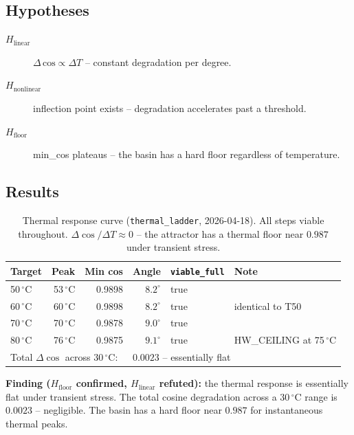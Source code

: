 \documentclass[11pt, a4paper]{article}
\begin{document}
\subsection{Hypotheses}

\begin{description}
  \item[$H_\text{linear}$] $\Delta\,\text{cos} \propto \Delta T$ -- constant
        degradation per degree.
  \item[$H_\text{nonlinear}$] inflection point exists -- degradation
        accelerates past a threshold.
  \item[$H_\text{floor}$] min\_cos plateaus -- the basin has a hard floor
        regardless of temperature.
\end{description}

\subsection{Results}

\begin{table}[!htb]
\centering
\begin{tabular}{lrrrll}
\toprule
Target & Peak & Min cos & Angle & \texttt{viable\_full} & Note \\
\midrule
50\,$^\circ$C & 53\,$^\circ$C & 0.9898 & $8.2^\circ$ & true & \\
60\,$^\circ$C & 60\,$^\circ$C & 0.9898 & $8.2^\circ$ & true & identical to T50 \\
70\,$^\circ$C & 70\,$^\circ$C & 0.9878 & $9.0^\circ$ & true & \\
80\,$^\circ$C & 76\,$^\circ$C & 0.9875 & $9.1^\circ$ & true & HW\_CEILING at 75\,$^\circ$C \\
\midrule
\multicolumn{3}{l}{Total $\Delta\cos$ across 30\,$^\circ$C:} & \multicolumn{3}{l}{$0.0023$ -- essentially flat} \\
\bottomrule
\end{tabular}
\caption{Thermal response curve (\texttt{thermal\_ladder}, 2026-04-18).
All steps viable throughout.
$\Delta\cos/\Delta T \approx 0$ -- the attractor has a thermal floor near $0.987$
under transient stress.}
\label{tab:ladder}
\end{table}

\textbf{Finding ($H_\text{floor}$ confirmed, $H_\text{linear}$ refuted):}
the thermal response is essentially flat under transient stress.
The total cosine degradation across a $30\,^\circ\mathrm{C}$ range is $0.0023$ --
negligible.
The basin has a hard floor near $0.987$ for instantaneous thermal peaks.
\end{document}
